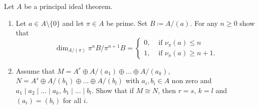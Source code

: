 \documentclass[a4paper,11pt]{article}
\begin{document}
Let $A$ be a principal ideal theorem.
\begin{enumerate}
    \item Let $a \in A\setminus \{0\}$ and let $\pi \in A$ be prime. Set 
        $B \coloneqq A/(a)$. For any $n \geq 0$ show that 
        \begin{equation*}
            \dim_{A/(\pi)} \pi^n B/\pi^{n+1}B = \begin{cases}
                0, &\text{ if }\nu_\pi(a) \leq n\\
                1, &\text{ if }\nu_\pi(a) \geq n+1.
            \end{cases}
        \end{equation*}
    \item Assume that $M = A^r \oplus A/(a_1) \oplus \dots \oplus A/(a_k)$,
        $N = A^s \oplus A/(b_1) \oplus \dots \oplus A/(b_l)$ with 
        $a_i, b_i \in A$ non zero and $a_1 \mid a_2 \mid \dots \mid a_k$,
        $b_1 \mid \dots \mid b_l$. Show that if $M \cong N$, then $r=s$, 
        $k = l$ and $(a_i) = (b_i)$ for all $i$. 
\end{enumerate}

\contactend
\end{document}

